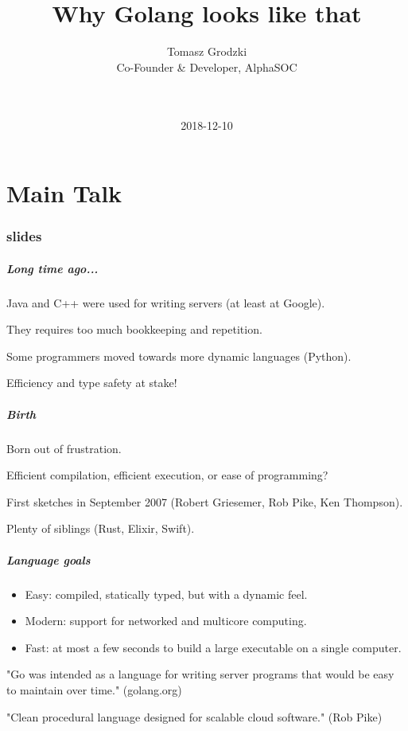 \documentclass[9pt]{beamer}
\title[Why Golang looks like that]{Why Golang looks like that}
\author[Tomasz Grodzki]{
 \parbox{0.26\textwidth}{
	\texorpdfstring
	  {
		\centering
 		Tomasz Grodzki \\
 		Co-Founder \& Developer, AlphaSOC \\
 		\myblue{\href{mailto:tomasz@alphasoc.com}{\texttt{tomasz@alphasoc.com}}} \\
 		\myblue{\href{https://github.com/tg}{\texttt{https://github.com/tg}}} \\
 	  }
	{Tomasz Grodzki}
}
 }
\date{2018-12-10}
\begin{document}
\frame{\titlepage
}

\part<presentation>{Main Talk}

\section[slides]{slides}

\begin{frame}[fragile]
\frametitle{Long time ago...}


Java and C++ were used for writing servers (at least at Google).


They requires too much bookkeeping and repetition.


Some programmers moved towards more dynamic languages (Python).


Efficiency and type safety at stake!



\end{frame}

\begin{frame}[fragile]
\frametitle{Birth}


Born out of frustration.


Efficient compilation, efficient execution, or ease of programming?


First sketches in September 2007 (Robert Griesemer, Rob Pike, Ken Thompson).


Plenty of siblings (Rust, Elixir, Swift).



\end{frame}

\begin{frame}[fragile]
\frametitle{Language goals}


\begin{itemize}
\item Easy: compiled, statically typed, but with a dynamic feel.
\item Modern: support for networked and multicore computing.
\item Fast: at most a few seconds to build a large executable on a single computer.
\end{itemize}

"Go was intended as a language for writing server programs that would be easy to maintain over time." (golang.org)


"Clean procedural language designed for scalable cloud software." (Rob Pike)



\end{frame}
\end{document}
